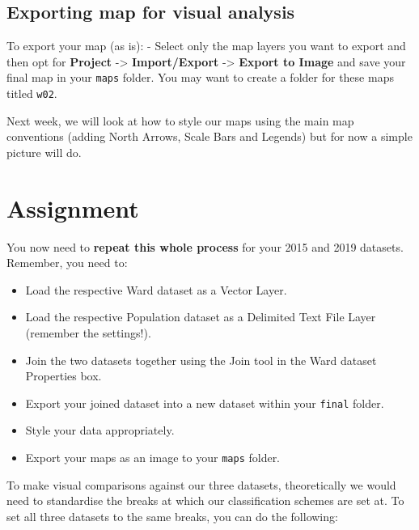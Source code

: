 \documentclass[
]{book}
\providecommand{\tightlist}{%
  \setlength{\itemsep}{0pt}\setlength{\parskip}{0pt}}
\begin{document}
\hypertarget{exporting-map-for-visual-analysis}{%
\subsection{Exporting map for visual analysis}\label{exporting-map-for-visual-analysis}}

To export your map (as is):
- Select only the map layers you want to export and then opt for \textbf{Project} -\textgreater{} \textbf{Import/Export} -\textgreater{} \textbf{Export to Image} and save your final map in your \texttt{maps} folder. You may want to create a folder for these maps titled \texttt{w02}.

Next week, we will look at how to style our maps using the main map conventions (adding North Arrows, Scale Bars and Legends) but for now a simple picture will do.

\hypertarget{assignment-w02}{%
\section{Assignment}\label{assignment-w02}}

You now need to \textbf{repeat this whole process} for your 2015 and 2019 datasets. Remember, you need to:

\begin{itemize}
\tightlist
\item
  Load the respective Ward dataset as a Vector Layer.
\item
  Load the respective Population dataset as a Delimited Text File Layer (remember the settings!).
\item
  Join the two datasets together using the Join tool in the Ward dataset Properties box.
\item
  Export your joined dataset into a new dataset within your \texttt{final} folder.
\item
  Style your data appropriately.
\item
  Export your maps as an image to your \texttt{maps} folder.
\end{itemize}

To make visual comparisons against our three datasets, theoretically we would need to standardise the breaks at which our classification schemes are set at. To set all three datasets to the same breaks, you can do the following:
\end{document}
